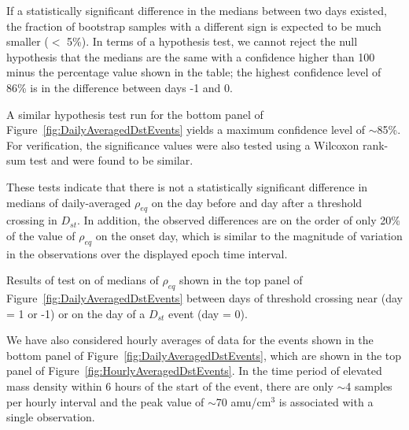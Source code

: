 \documentclass[12pt]{article}
\begin{document}
If a statistically significant difference in the medians between two days existed, the fraction of bootstrap samples with a different sign is expected to be much smaller ($<$ 5\%).  In terms of a hypothesis test, we cannot reject the null hypothesis that the medians are the same with a confidence higher than 100 minus the percentage value shown in the table; the highest confidence level of 86\% is in the difference between days -1 and 0.

A similar hypothesis test run for the bottom panel of Figure~\ref{fig:DailyAveragedDstEvents} yields a maximum confidence level of $\sim$85\%.  For verification, the significance values were also tested using a Wilcoxon rank-sum test and were found to be similar. 

These tests indicate that there is not a statistically significant difference in medians of daily-averaged $\rho_{eq}$ on the day before and day after a threshold crossing in $D_{st}$.  In addition, the observed differences are on the order of only 20\% of the value of $\rho_{eq}$ on the onset day, which is similar to the magnitude of variation in the observations over the displayed epoch time interval.  

\begin{table}
\small
\centering

\caption{Results of test on of medians of $\rho_{eq}$ shown in the top panel of Figure~\ref{fig:DailyAveragedDstEvents} between days of threshold crossing  near (day = 1 or -1) or on the day of a $D_{st}$ event (day = 0).}
\label{BootstrapDifferenceTable}
\end{table}

We have also considered hourly averages of data for the events shown in the bottom panel of Figure~\ref{fig:DailyAveragedDstEvents}, which are shown in the top panel of Figure~\ref{fig:HourlyAveragedDstEvents}.  In the time period of elevated mass density within 6 hours of the start of the event, there are only $\sim$4 samples per hourly interval and the peak value of $\sim$70 amu/cm$^3$ is associated with a single observation. 
\end{document}
